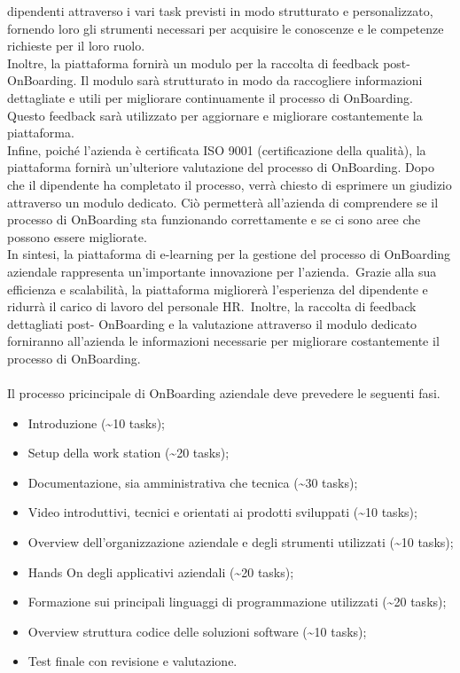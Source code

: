 dipendenti attraverso i vari task previsti in modo strutturato e personalizzato, 
fornendo loro gli strumenti necessari per acquisire le conoscenze e le competenze 
richieste per il loro ruolo. \\
Inoltre, la piattaforma fornirà un modulo per la raccolta di feedback post-OnBoarding. 
Il modulo sarà strutturato in modo da raccogliere informazioni dettagliate e utili per 
migliorare continuamente il processo di OnBoarding. Questo feedback sarà utilizzato 
per aggiornare e migliorare costantemente la piattaforma. \\ 
Infine, poiché l'azienda è certificata ISO 9001 (certificazione della qualità), la 
piattaforma fornirà un'ulteriore valutazione del processo di OnBoarding. Dopo che il 
dipendente ha completato il processo, verrà chiesto di esprimere un giudizio 
attraverso un modulo dedicato. Ciò permetterà all'azienda di comprendere se il 
processo di OnBoarding sta funzionando correttamente e se ci sono aree che 
possono essere migliorate. \\ 
In sintesi, la piattaforma di e-learning per la gestione del processo di OnBoarding 
aziendale rappresenta un'importante innovazione per l'azienda.\ Grazie alla sua 
efficienza e scalabilità, la piattaforma migliorerà l'esperienza del dipendente e ridurrà 
il carico di lavoro del personale HR.\ Inoltre, la raccolta di feedback dettagliati post-
OnBoarding e la valutazione attraverso il modulo dedicato forniranno all'azienda le 
informazioni necessarie per migliorare costantemente il processo di OnBoarding.
\\ \\
Il processo pricincipale di OnBoarding aziendale deve prevedere le seguenti fasi.
\begin{itemize}
    \item Introduzione (\textasciitilde{10} tasks);
    \item Setup della work station (\textasciitilde{20} tasks);
    \item Documentazione, sia amministrativa che tecnica (\textasciitilde{30} tasks);
    \item Video introduttivi, tecnici e orientati ai prodotti sviluppati (\textasciitilde{10} tasks);
    \item Overview dell'organizzazione aziendale e degli strumenti utilizzati (\textasciitilde{10} tasks);
    \item Hands On degli applicativi aziendali (\textasciitilde{20} tasks);
    \item Formazione sui principali linguaggi di programmazione utilizzati (\textasciitilde{20} tasks);
    \item Overview struttura codice delle soluzioni software (\textasciitilde{10} tasks);
    \item Test finale con revisione e valutazione.
\end{itemize}
